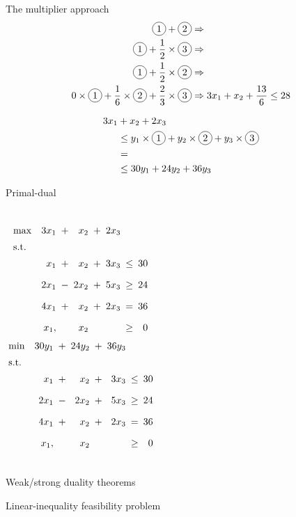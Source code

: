 \begin{frame}{The multiplier approach}
  \begin{align*}
	\circled{1} + \circled{2} &\Rightarrow	\\
	\circled{1} + \frac{1}{2} \times \circled{3} &\Rightarrow \\
	\circled{1} + \frac{1}{2} \times \circled{2} &\Rightarrow \\
	0 \times \circled{1} + \frac{1}{6} \times \circled{2} + \frac{2}{3} \times \circled{3} &\Rightarrow 3x_1 + x_2 + \frac{13}{6} \leq 28
  \end{align*}

  \begin{align*}
	3x_1 &+ x_2 + 2x_3	\\
		&\leq y_1 \times \circled{1} + y_2 \times \circled{2} + y_3 \times \circled{3} \\
		&=	\\
		&\leq 30y_1 + 24y_2 + 36y_3
  \end{align*}
\end{frame}
\begin{frame}{Primal-dual }
  \begin{columns}
	  \begin{equation*}
		\setlength\arraycolsep{2.5pt}
		\begin{array}{l@{\quad}rcrcrcr}
		  \max 	& 3x_1  &+&	x_2		&+&	2x_3	&	&	\\[5pt]
		  \text{s.t.} 	&	&	&	&	&	&	&	\\[5pt]
				& x_1   	&+&	x_2	&+&	3x_3	&\leq& 30 \\[10pt]
				& 2x_1	&-&	2x_2 	&+& 5x_3 	&\geq& 24 \\[10pt]
				& 4x_1   	&+&	x_2		&+&	2x_3	&=& 36	\\[10pt]
				& x_1,	&&	x_2	&&	&\geq&	0
		\end{array}
	  \end{equation*}
	  \begin{equation*}
		\setlength\arraycolsep{2.5pt}
		\begin{array}{l@{\quad}rcrcrcr}
		  \min 	& 30y_1  &+&	24y_2		&+&	36y_3	&	&	\\[5pt]
		  \text{s.t.} 	&	&	&	&	&	&	&	\\[5pt]
				& x_1   	&+&	x_2	&+&	3x_3	&\leq& 30 \\[10pt]
				& 2x_1	&-&	2x_2 	&+& 5x_3 	&\geq& 24 \\[10pt]
				& 4x_1   	&+&	x_2		&+&	2x_3	&=& 36	\\[10pt]
				& x_1,	&&	x_2	&&	&\geq&	0
		\end{array}
	  \end{equation*}
  \end{columns}
\end{frame}
\begin{frame}{Weak/strong duality theorems}
  
\end{frame}
\begin{frame}{Linear-inequality feasibility problem }
  
\end{frame}
